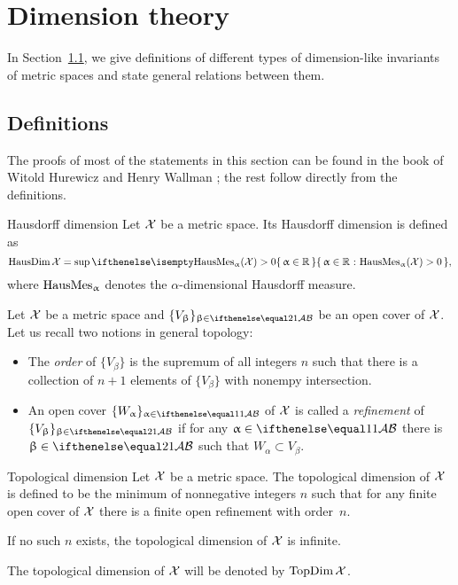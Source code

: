 \chapter{Dimension theory}\label{ch:dim}

In Section~\ref{sec:prelim:dim}, we give definitions of different types of dimension-like invariants of metric spaces and state general relations between them.


\section{Definitions}\label{sec:prelim:dim}

The proofs of most of the statements in this section can be found in the book of Witold Hurewicz and Henry Wallman \cite{hurewicz-wallman}; 
the rest follow directly from the definitions.

\begin{thm}{Hausdorff dimension}
\label{def:HausDim}
Let $\mathcal{X}$ be a metric space. 
Its Hausdorff dimension is defined as
\[\HausDim\spc{X}=\sup\set{\alpha\in\RR}{\HausMes_\alpha(\spc{X})>0},\]
where $\mathop{\rm HausMes}\nolimits_\upalpha$ denotes the $\alpha$-dimensional Hausdorff measure.
\end{thm}

Let $\mathcal{X}$ be a metric space and $\{V_\beta\}_{\beta\in\IndexSet[2]}$
 be an open cover of $\mathcal{X}$.
Let us recall two notions in general topology:
\begin{itemize}

\item The \emph{order} of $\{V_\beta\}$ is the supremum of all integers $n$ such that there is a collection of $n+1$ elements of $\{V_\beta\}$ with nonempy intersection.

\item An open cover $\{W_\alpha\}_{\alpha\in\IndexSet}$ of $\mathcal{X}$ is called a \emph{refinement} of  $\{V_\beta\}_{\beta\in\IndexSet[2]}$ if for any $\alpha\in\IndexSet$ there is $\beta\in\IndexSet[2]$ such that $W_\alpha\subset V_\beta$.

\end{itemize}

\begin{thm}{Topological dimension}\label{def:TopDim}
Let $\mathcal{X}$ be a metric space. 
The topological dimension of $\mathcal{X}$ is defined to be the minimum of nonnegative integers $n$ 
such that for any finite open cover of $\mathcal{X}$ there is a finite open refinement with order~$n$.

If no such $n$ exists, the topological dimension of $\mathcal{X}$ is infinite.

The topological dimension of $\mathcal{X}$ will be denoted by $\mathop{\rm TopDim}\nolimits\mathcal{X}$.
\end{thm}


